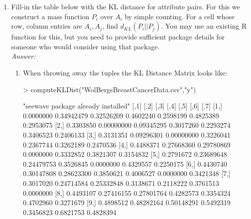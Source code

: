 \documentclass{article}
\begin{document}
\begin{enumerate}
\begin{enumerate}
		\item Fill-in the table below with the KL distance for attribute pairs. For this we construct a mass function $P_i$ over $A_i$ by simple counting. For a cell whose row, column entries are $A_i,A_j$, find $d_{KL}(P_i||P_j)$. You may use an existing R function for this, but you need to provide sufficient package details for someone who would consider using that package.\\
		\emph{Answer:}
		\begin{enumerate}	
			\item When throwing away the tuples the KL Distance Matrix looks like:
\begin{Sinput}
> computeKLDist("WolBergsBreastCancerData.csv","y")
\end{Sinput}			
\begin{Soutput}			
[1] "seewave package already installed"
           [,1]       [,2]       [,3]      [,4]      [,5]      [,6]      [,7]
 [1,] 0.0000000 0.34942479 0.32526209 0.4602240 0.2598199 0.4825389 0.2953075
 [2,] 0.3303850 0.00000000 0.09345295 0.3017260 0.2293274 0.3406523 0.2406133
 [3,] 0.3131351 0.09296301 0.00000000 0.3226041 0.2367744 0.3262189 0.2470536
 [4,] 0.4488371 0.27668360 0.29780869 0.0000000 0.3332852 0.3821307 0.3154832
 [5,] 0.2791672 0.23689648 0.24479753 0.3526845 0.0000000 0.4329557 0.2250175
 [6,] 0.4430740 0.30147808 0.28623300 0.3850621 0.4006527 0.0000000 0.3421348
 [7,] 0.3017020 0.24714584 0.25332848 0.3138671 0.2118222 0.3761513 0.0000000
 [8,] 0.4493107 0.27416155 0.27801764 0.4282573 0.3354324 0.4702960 0.3271679
 [9,] 0.4898512 0.48282164 0.50148291 0.5492319 0.3456823 0.6821753 0.4828394
\end{Soutput}


\end{enumerate}
\end{enumerate}
\end{enumerate}
\end{document}
